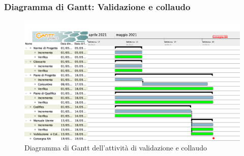 \subsubsection{Diagramma di Gantt: Validazione e collaudo}\label{GanttValidazione}
\begin{figure}[ht]
    \centering
    \includegraphics[width=\textwidth]{Immagini/GanttValidazioneECollaudo}
    \caption{Diagramma di Gantt dell'attività di validazione e collaudo}
\end{figure}